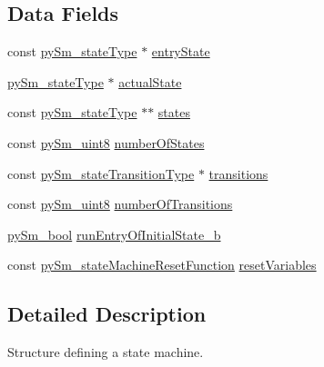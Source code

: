\subsection*{Data Fields}
\begin{DoxyCompactItemize}
\item 
const \hyperlink{structpySm__stateType}{py\+Sm\+\_\+state\+Type} $\ast$ \hyperlink{structpySm__stateMachineType_ac9896d220e5e80df257943742f47f6d0}{entry\+State}
\item 
\hyperlink{structpySm__stateType}{py\+Sm\+\_\+state\+Type} $\ast$ \hyperlink{structpySm__stateMachineType_afff58d3fb0afd9064dfccf4f58cdb8b5}{actual\+State}
\item 
const \hyperlink{structpySm__stateType}{py\+Sm\+\_\+state\+Type} $\ast$$\ast$ \hyperlink{structpySm__stateMachineType_a6b964357abaeecf851825d1203a59582}{states}
\item 
const \hyperlink{PySm__types_8h_a1aff40256c00f194609879f8f6f1e1a1}{py\+Sm\+\_\+uint8} \hyperlink{structpySm__stateMachineType_a8df1d19072975480da4985f99f8ae19e}{number\+Of\+States}
\item 
const \hyperlink{structpySm__stateTransitionType}{py\+Sm\+\_\+state\+Transition\+Type} $\ast$ \hyperlink{structpySm__stateMachineType_a3f35562e1b353b47e2a90a957882a610}{transitions}
\item 
const \hyperlink{PySm__types_8h_a1aff40256c00f194609879f8f6f1e1a1}{py\+Sm\+\_\+uint8} \hyperlink{structpySm__stateMachineType_a3d4035a87cce41845ae138aa2a279e20}{number\+Of\+Transitions}
\item 
\hyperlink{PySm__types_8h_a368133d64634d66410f3fe1343de6ba3}{py\+Sm\+\_\+bool} \hyperlink{structpySm__stateMachineType_a3320131411f6304cba856edbcfedd060}{run\+Entry\+Of\+Initial\+State\+\_\+b}
\item 
const \hyperlink{PySm_8h_acf18fbe39f8464bd70f03199165ef4a2}{py\+Sm\+\_\+state\+Machine\+Reset\+Function} \hyperlink{structpySm__stateMachineType_a37e20b01fecc6d91d5625b0cd10dcfaa}{reset\+Variables}
\end{DoxyCompactItemize}


\subsection{Detailed Description}
Structure defining a state machine. 

